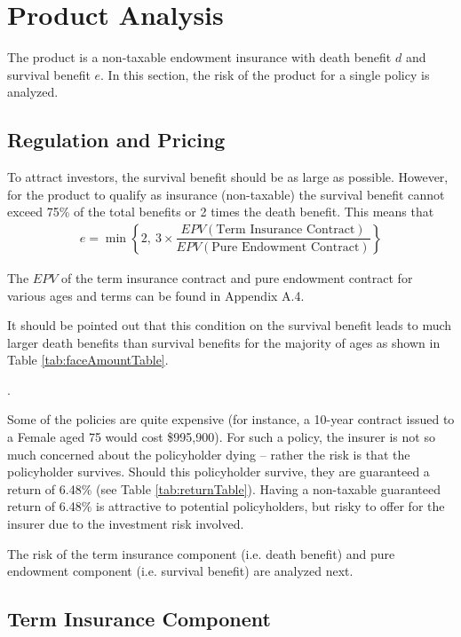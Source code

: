 \documentclass[12pt]{article}
\begin{document}
\section{Product Analysis}

The product is a non-taxable endowment insurance with death benefit $d$ and survival benefit $e$. In this section, the risk of the product for a single policy is analyzed.

\subsection{Regulation and Pricing}

To attract investors, the survival benefit should be as large as possible. However, for the product to qualify as insurance (non-taxable) the survival benefit cannot exceed 75\% of the total benefits or 2 times the death benefit. This means that
%
\begin{align}
e = \min\left\{2, \ 3 \times \dfrac{EPV(\text{Term Insurance Contract})}{EPV(\text{Pure Endowment Contract})} \right\}
\label{eqn:endowbenefit}
\end{align}

The $EPV$ of the term insurance contract and pure endowment contract for various ages and terms can be found in Appendix A.4.

It should be pointed out that this condition on the survival benefit leads to much larger death benefits than survival benefits for the majority of ages as shown in Table \ref{tab:faceAmountTable}.

.

Some of the policies are quite expensive (for instance, a 10-year contract issued to a Female aged 75 would cost \$995,900). For such a policy, the insurer is not so much concerned about the policyholder dying -- rather the risk is that the policyholder survives. Should this policyholder survive, they are guaranteed a return of 6.48\% (see Table \ref{tab:returnTable}). Having a non-taxable guaranteed return of 6.48\% is attractive to potential policyholders, but risky to offer for the insurer due to the investment risk involved.



The risk of the term insurance component (i.e. death benefit) and pure endowment component (i.e. survival benefit) are analyzed next.

\subsection{Term Insurance Component}
\end{document}
